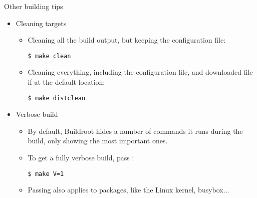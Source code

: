 \begin{frame}[fragile]{Other building tips}
  \begin{itemize}
  \item Cleaning targets
    \begin{itemize}
    \item Cleaning all the build output, but keeping the configuration
      file:
      \begin{block}{}
\begin{verbatim}
$ make clean
\end{verbatim}
      \end{block}
    \item Cleaning everything, including the configuration file, and
      downloaded file if at the default location:
      \begin{block}{}
\begin{verbatim}
$ make distclean
\end{verbatim}
      \end{block}
    \end{itemize}
  \item Verbose build
    \begin{itemize}
    \item By default, Buildroot hides a number of commands it runs
      during the build, only showing the most important ones.
    \item To get a fully verbose build, pass :
      \begin{block}{}
\begin{verbatim}
$ make V=1
\end{verbatim}
      \end{block}
    \item Passing  also applies to packages, like the Linux
      kernel, busybox...
    \end{itemize}
  \end{itemize}
\end{frame}
